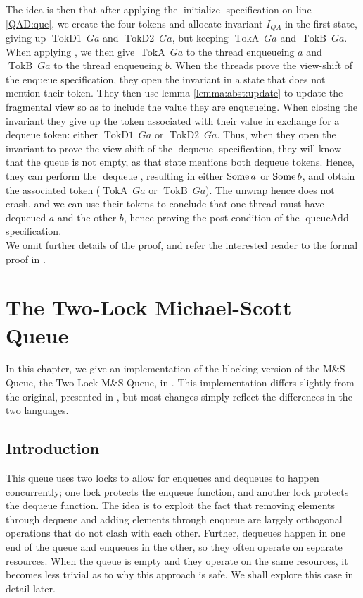 \documentclass[a4paper, 10pt]{report}
\theoremstyle{definition}
\newcommand{\initialise}{\operatorname{initialize}}
\newcommand{\dequeue}{\operatorname{dequeue}}
\newcommand{\queueAdd}{\operatorname{queueAdd}}
\newcommand{\msq}{M\&S Queue}
\newcommand{\tlmsq}{Two-Lock \msq{}}
\newcommand{\QueueAddInvariant}{I_{QA}}
\newcommand{\QAg}{Ga}
\newcommand{\TokDo}[1]{\operatorname{TokD1} ~ #1}
\newcommand{\TokDoQAg}{\TokDo{\QAg}}
\newcommand{\TokDt}[1]{\operatorname{TokD2} ~ #1}
\newcommand{\TokDtQAg}{\TokDt{\QAg}}
\newcommand{\TokA}[1]{\operatorname{TokA} ~ #1}
\newcommand{\TokAQAg}{\TokA{\QAg}}
\newcommand{\TokB}[1]{\operatorname{TokB} ~ #1}
\newcommand{\TokBQAg}{\TokB{\QAg}}
\begin{document}
The idea is then that after applying the $\initialise$ specification on line \ref{QAD:que}, we create the four tokens and allocate invariant $\QueueAddInvariant$ in the first state, giving up $\TokDoQAg$ and $\TokDtQAg$, but keeping $\TokAQAg$ and $\TokBQAg$. When applying , we then give $\TokAQAg$ to the thread enqueueing $a$ and $\TokBQAg$ to the thread enqueueing $b$. When the threads prove the view-shift of the enqueue specification, they open the invariant in a state that does not mention their token. They then use lemma \ref{lemma:abst:update} to update the fragmental view so as to include the value they are enqueueing. When closing the invariant they give up the token associated with their value in exchange for a dequeue token: either $\TokDoQAg$ or $\TokDtQAg$. Thus, when they open the invariant to prove the view-shift of the $\dequeue$ specification, they will know that the queue is not empty, as that state mentions both dequeue tokens. Hence, they can perform the $\dequeue$, resulting in either $\operatorname{Some} a$ or $\operatorname{Some} b$, and obtain the associated token ($\TokAQAg$ or $\TokBQAg$). The unwrap hence does not crash, and we can use their tokens to conclude that one thread must have dequeued $a$ and the other $b$, hence proving the post-condition of the $\queueAdd$ specification.\\
We omit further details of the proof, and refer the interested reader to the formal proof in .


\chapter{The Two-Lock Michael-Scott Queue}
\label{ch:TLMSQ}

In this chapter, we give an implementation of the blocking version of the \msq{}, the \tlmsq{}, in \heaplang. This implementation differs slightly from the original, presented in \citet{DBLP:conf/podc/MichaelS96}, but most changes simply reflect the differences in the two languages.

\section{Introduction}
\label{TLMSQ:section:introduction}

This queue uses two locks to allow for enqueues and dequeues to happen concurrently; one lock protects the enqueue function, and another lock protects the dequeue function. The idea is to exploit the fact that removing elements through dequeue and adding elements through enqueue are largely orthogonal operations that do not clash with each other. Further, dequeues happen in one end of the queue and enqueues in the other, so they often operate on separate resources. When the queue is empty and they operate on the same resources, it becomes less trivial as to why this approach is safe. We shall explore this case in detail later.
\end{document}

